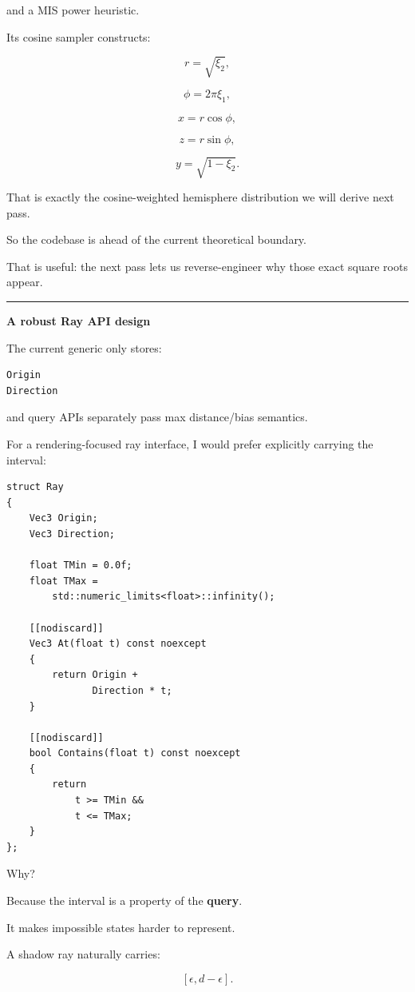 and a MIS power heuristic.

Its cosine sampler constructs:

\[
r=\sqrt{\xi_2},
\]

\[
\phi=2\pi\xi_1,
\]

\[
x=r\cos\phi,
\]

\[
z=r\sin\phi,
\]

\[
y=\sqrt{1-\xi_2}.
\]

That is exactly the cosine-weighted hemisphere distribution we will derive next pass.

So the codebase is ahead of the current theoretical boundary.

That is useful: the next pass lets us reverse-engineer why those exact square roots appear.

\begin{center}\rule{0.5\linewidth}{0.5pt}\end{center}

\textbf{A robust Ray API design}

The current generic  only stores:

\begin{verbatim}
Origin
Direction
\end{verbatim}

and query APIs separately pass max distance/bias semantics.

For a rendering-focused ray interface, I would prefer explicitly carrying the interval:

\begin{verbatim}
struct Ray
{
    Vec3 Origin;
    Vec3 Direction;

    float TMin = 0.0f;
    float TMax =
        std::numeric_limits<float>::infinity();

    [[nodiscard]]
    Vec3 At(float t) const noexcept
    {
        return Origin +
               Direction * t;
    }

    [[nodiscard]]
    bool Contains(float t) const noexcept
    {
        return
            t >= TMin &&
            t <= TMax;
    }
};
\end{verbatim}

Why?

Because the interval is a property of the \textbf{query}.

It makes impossible states harder to represent.

A shadow ray naturally carries:

\[
[\epsilon,d-\epsilon].
\]

